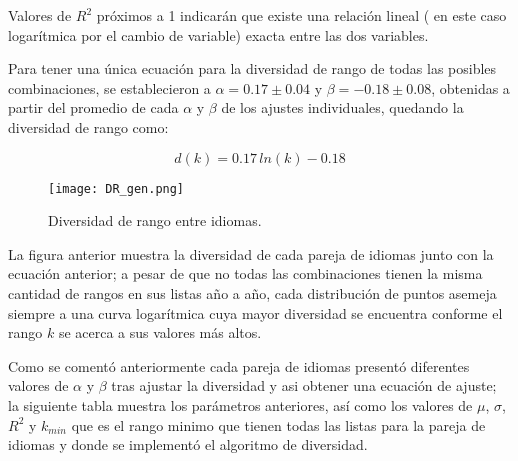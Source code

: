 Valores de $R^{2}$ próximos a 1 indicarán que existe una relación lineal ( en este caso logarítmica por el cambio de variable) exacta entre las dos variables.

Para tener una única ecuación para la diversidad de rango de todas las posibles  combinaciones, se establecieron a $\alpha = 0.17\pm 0.04$ y $\beta = -0.18 \pm 0.08$, obtenidas a partir del promedio de cada $\alpha$ y $\beta$ de los ajustes individuales, quedando la diversidad de rango como:

\begin{equation}
	\label{ec.gen_ajs}
	d(k) = 0.17\,ln(k) - 0.18
\end{equation} 




\clearpage

\begin{figure}[h!]
	\centering
	\texttt{[image: DR\_gen.png]}
	\label{fig.DR_gen}
	\caption{Diversidad de rango entre idiomas.}
\end{figure}
 

La figura anterior muestra la diversidad de cada pareja de idiomas junto con la ecuación anterior; a pesar de que no todas las combinaciones tienen la misma cantidad de rangos en sus listas año a año, cada distribución de puntos asemeja siempre a una curva logarítmica cuya mayor diversidad se encuentra conforme el rango $k$ se acerca a sus valores más altos.

Como se comentó anteriormente cada pareja de idiomas presentó diferentes valores de $\alpha$ y $\beta$ tras ajustar la diversidad y asi obtener una ecuación de ajuste; la siguiente tabla muestra los parámetros anteriores, así como los valores de $\mu$, $\sigma$, $R^{2}$ y $k_{min}$ que es el rango minimo que tienen todas las listas para la pareja de idiomas y donde se implementó el algoritmo de diversidad.

